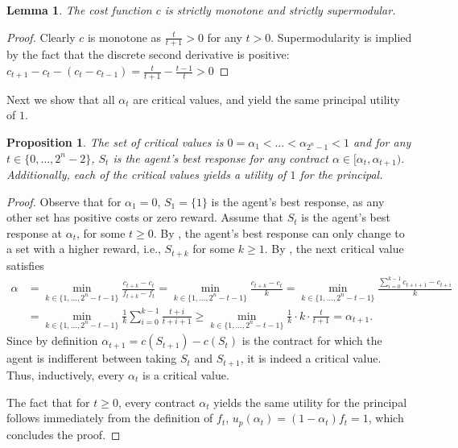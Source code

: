 \documentclass[11pt]{article}
\newtheorem{lemma}{Lemma}
\newtheorem{proposition}{Proposition}
\begin{document}
\begin{lemma}\label{lem:cMonoSuperMod}
     The cost function $c$ is strictly monotone and strictly supermodular.
\end{lemma}
\begin{proof}
    Clearly $c$ is monotone as $\frac{t}{t+1} > 0$ for any $t>0$.
    Supermodularity is implied by the fact that the discrete second derivative is positive:
    $
    c_{t+1}-c_t - (c_t-c_{t-1})
    =
    \frac{t}{t+1} - \frac{t-1}{t} > 0
    $
\end{proof}

Next we show that all $\alpha_t$ are critical values, and yield the same principal utility of $1$.
\begin{proposition}\label{prop:CVs_supc_c}
    The set of critical values is $0 = \alpha_1 < \ldots < \alpha_{2^n-1} < 1$ and for any $t \in \{0, \ldots, 2^n-2\}$, $S_t$ is the agent's best response for any contract $\alpha \in [\alpha_t, \alpha_{t+1})$. Additionally, each of the critical values yields a utility of $1$ for the principal.
\end{proposition}
\begin{proof}
Observe that for $\alpha_1=0$, $S_1=\{1\}$ is the agent's best response, as any other set has positive costs or zero reward.
Assume that $S_t$ is the agent's best response at $\alpha_t$, for some $t\ge 0$. By , the agent's best response can only change to a set with a higher reward, i.e., $S_{t+k}$ for some $k\ge1$. 
By , the next critical value satisfies
\begin{align*}
    \alpha 
    &=  
    \min_{k \in \{1,\ldots,2^n-t-1\}} \frac{c_{t+k} - c_{t}}{f_{t+k}-f_{t}} 
    =
    \min_{k \in \{1,\ldots,2^n-t-1\}}
    \frac{c_{t+k} - c_{t}}{k} 
    =
    \min_{k \in \{1,\ldots,2^n-t-1\}}
    \frac{\sum_{i=0}^{k-1}c_{t+i+1}-c_{t+i}}{k} \\
    &=
    \min_{k \in \{1,\ldots,2^n-t-1\}}
    \frac{1}{k}\sum_{i=0}^{k-1} \frac{t+i}{t+i+1} 
    \ge
    \min_{k \in \{1,\ldots,2^n-t-1\}}
    \frac{1}{k}\cdot k \cdot \frac{t}{t+1} 
    =
    \alpha_{t+1}.
\end{align*}
Since by definition $\alpha_{t+1}=c(S_{t+1})-c(S_t)$ is the contract for which the agent is indifferent between taking $S_t$ and $S_{t+1}$, it is indeed a critical value. Thus, inductively, every $\alpha_t$ is a critical value.

The fact that for $t \ge 0$, every contract $\alpha_t$ yields the same utility for the principal follows immediately from the definition of $f_t$,
$u_p(\alpha_t) = (1-\alpha_t)f_t = 1$, which concludes the proof.
\end{proof}
\end{document}
